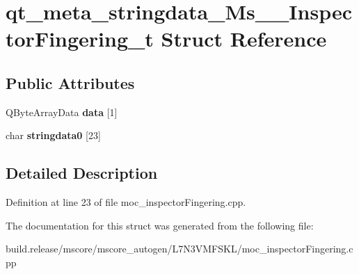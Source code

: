 \hypertarget{structqt__meta__stringdata___ms_____inspector_fingering__t}{}\section{qt\+\_\+meta\+\_\+stringdata\+\_\+\+Ms\+\_\+\+\_\+\+Inspector\+Fingering\+\_\+t Struct Reference}
\label{structqt__meta__stringdata___ms_____inspector_fingering__t}
\subsection*{Public Attributes}
\begin{DoxyCompactItemize}
\item 
\mbox{\label{structqt__meta__stringdata___ms_____inspector_fingering__t_ad0b5e1b450d15ed2ccf393bf6a4a4968}} 
Q\+Byte\+Array\+Data {\bfseries data} \mbox{[}1\mbox{]}
\item 
\mbox{\label{structqt__meta__stringdata___ms_____inspector_fingering__t_a8fcbc2533f461ae8ae991ec1e50be43a}} 
char {\bfseries stringdata0} \mbox{[}23\mbox{]}
\end{DoxyCompactItemize}


\subsection{Detailed Description}


Definition at line 23 of file moc\+\_\+inspector\+Fingering.\+cpp.



The documentation for this struct was generated from the following file\+:\begin{DoxyCompactItemize}
\item 
build.\+release/mscore/mscore\+\_\+autogen/\+L7\+N3\+V\+M\+F\+S\+K\+L/moc\+\_\+inspector\+Fingering.\+cpp\end{DoxyCompactItemize}
